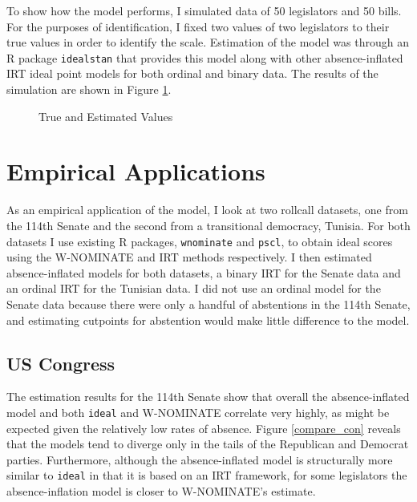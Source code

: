 	To show how the model performs, I simulated data of 50 legislators and 50 bills. For the purposes of identification, I fixed two values of two legislators to their true values in order to identify the scale. Estimation of the model was through an R package \texttt{idealstan} that provides this model along with other absence-inflated IRT ideal point models for both ordinal and binary data. The results of the simulation are shown in Figure \ref{sim_results}.
	
	\begin{figure}
		\caption{True and Estimated Values}\label{sim_results}
	\end{figure} 
	
	\section*{Empirical Applications}
	
	As an empirical application of the model, I look at two rollcall datasets, one from the 114th Senate and the second from a transitional democracy, Tunisia. For both datasets I use existing R packages, \texttt{wnominate} and \texttt{pscl}, to obtain ideal scores using the W-NOMINATE and IRT methods respectively. I then estimated absence-inflated models for both datasets, a binary IRT for the Senate data and an ordinal IRT for the Tunisian data. I did not use an ordinal model for the Senate data because there were only a handful of abstentions in the 114th Senate, and estimating cutpoints for abstention would make little difference to the model. 
	
	\subsection*{US Congress}
	
	The estimation results for the 114th Senate show that overall the absence-inflated model and both \texttt{ideal} and W-NOMINATE correlate very highly, as might be expected given the relatively low rates of absence. Figure \ref{compare_con} reveals that the models tend to diverge only in the tails of the Republican and Democrat parties. Furthermore, although the absence-inflated model is structurally more similar to \texttt{ideal} in that it is based on an IRT framework, for some legislators the absence-inflation model is closer to W-NOMINATE's estimate. 
	
